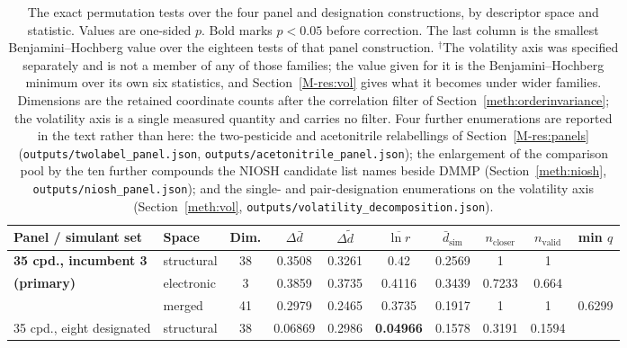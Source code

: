 \begin{table}[htb]
\centering
\caption{The exact permutation tests over the four panel and designation
constructions, by descriptor space and statistic. Values are one-sided $p$.
Bold marks $p<0.05$ before correction. The last column is the smallest
Benjamini--Hochberg value over the eighteen tests of that panel construction.
$^{\dagger}$The volatility axis was specified separately and is not a member of
any of those families; the value given for it is the Benjamini--Hochberg
minimum over its own six statistics, and
Section~\ref{M-res:vol} gives what it becomes under wider families.
Dimensions are the retained coordinate counts after the correlation filter of
Section~\ref{meth:orderinvariance}; the volatility axis is a single measured
quantity and carries no filter. Four further enumerations are reported in the
text rather than here: the two-pesticide and acetonitrile relabellings of
Section~\ref{M-res:panels}
(\texttt{outputs/twolabel\_panel.json}, \texttt{outputs/acetonitrile\_panel.json});
the enlargement of the comparison pool by the ten further compounds the
NIOSH candidate list names beside DMMP (Section~\ref{meth:niosh},
\texttt{outputs/niosh\_panel.json}); and the single- and pair-designation
enumerations on the volatility axis (Section~\ref{meth:vol},
\texttt{outputs/volatility\_decomposition.json}).}
\label{tab:ablation}
\footnotesize
\setlength{\tabcolsep}{3pt}
\begin{tabular}{llcccccccc}
\hline
Panel / simulant set & Space & Dim. & $\Delta\bar{d}$ & $\Delta\tilde{d}$ &
$\overline{\ln r}$ & $\bar{d}_\mathrm{sim}$ & $n_\mathrm{closer}$ &
$n_\mathrm{valid}$ & min $q$ \\
\hline
\textbf{35 cpd., incumbent 3} & structural  & 38 & 0.3508 & 0.3261 & 0.42 & 0.2569 & 1 & 1 &  \\
\textbf{(primary)}     & electronic  &  3 & 0.3859 & 0.3735 & 0.4116 & 0.3439 & 0.7233 & 0.664 &  \\
                       & merged      & 41 & 0.2979 & 0.2465 & 0.3735 & 0.1917 & 1 & 1 & 0.6299 \\
\hline
35 cpd., eight designated & structural  & 38 & 0.06869 & 0.2986 & \textbf{0.04966} & 0.1578 & 0.3191 & 0.1594 &  \\

\end{tabular}
\end{table}
